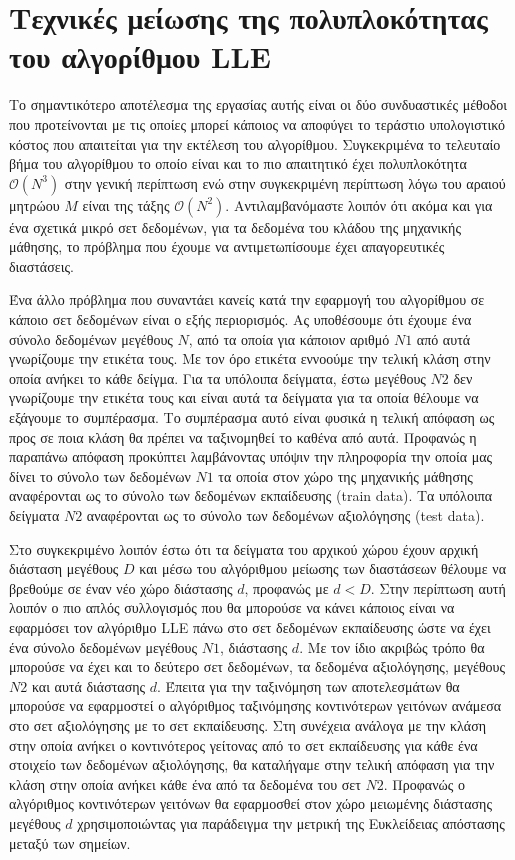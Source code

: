 
\chapter{Τεχνικές μείωσης της πολυπλοκότητας του αλγορίθμου \textlatin{LLE}}
\par
Το σημαντικότερο αποτέλεσμα της εργασίας αυτής είναι οι δύο συνδυαστικές μέθοδοι που προτείνονται με τις οποίες μπορεί κάποιος να αποφύγει το τεράστιο υπολογιστικό κόστος που απαιτείται για την εκτέλεση του αλγορίθμου. Συγκεκριμένα το τελευταίο βήμα του αλγορίθμου το οποίο είναι και το πιο απαιτητικό έχει πολυπλοκότητα $\mathcal{O}(N^{3})$ στην γενική περίπτωση ενώ στην συγκεκριμένη περίπτωση λόγω του αραιού μητρώου $M$ είναι της τάξης $\mathcal{O}(N^{2})$. Αντιλαμβανόμαστε λοιπόν ότι ακόμα και για ένα σχετικά μικρό σετ δεδομένων, για τα δεδομένα του κλάδου της μηχανικής μάθησης, το πρόβλημα που έχουμε να αντιμετωπίσουμε έχει απαγορευτικές διαστάσεις. 
\par
Ένα άλλο πρόβλημα που συναντάει κανείς κατά την εφαρμογή του αλγορίθμου σε κάποιο σετ δεδομένων είναι ο εξής περιορισμός. Ας υποθέσουμε ότι έχουμε ένα σύνολο δεδομένων μεγέθους $N$, από τα οποία για κάποιον αριθμό $N1$ από αυτά γνωρίζουμε την ετικέτα τους. Με τον όρο ετικέτα εννοούμε την τελική κλάση στην οποία ανήκει το κάθε δείγμα. Για τα υπόλοιπα δείγματα, έστω μεγέθους $N2$ δεν γνωρίζουμε την ετικέτα τους και είναι αυτά τα δείγματα για τα οποία θέλουμε να εξάγουμε το συμπέρασμα. Το συμπέρασμα αυτό είναι φυσικά η τελική απόφαση ως προς σε ποια κλάση θα πρέπει να ταξινομηθεί το καθένα από αυτά. Προφανώς η παραπάνω απόφαση προκύπτει λαμβάνοντας υπόψιν την πληροφορία την οποία μας δίνει το σύνολο των δεδομένων $N1$ τα οποία στον χώρο της μηχανικής μάθησης αναφέρονται ως το σύνολο των δεδομένων εκπαίδευσης \textlatin{(train data)}. Τα υπόλοιπα δείγματα $N2$ αναφέρονται ως το σύνολο των δεδομένων αξιολόγησης \textlatin{(test data)}.
\par
Στο συγκεκριμένο λοιπόν έστω ότι τα δείγματα του αρχικού χώρου έχουν αρχική διάσταση μεγέθους $D$ και μέσω του αλγόριθμου μείωσης των διαστάσεων θέλουμε να βρεθούμε σε έναν νέο χώρο διάστασης $d$, προφανώς με $d < D$. Στην περίπτωση αυτή λοιπόν ο πιο απλός συλλογισμός που θα μπορούσε να κάνει κάποιος είναι να εφαρμόσει τον αλγόριθμο \textlatin{LLE} πάνω στο σετ δεδομένων εκπαίδευσης ώστε να έχει ένα σύνολο δεδομένων μεγέθους $Ν1$, διάστασης $d$. Με τον ίδιο ακριβώς τρόπο θα μπορούσε να έχει και το δεύτερο σετ δεδομένων, τα δεδομένα αξιολόγησης, μεγέθους $N2$ και αυτά διάστασης $d$. Έπειτα για την ταξινόμηση των αποτελεσμάτων θα μπορούσε να εφαρμοστεί ο αλγόριθμος ταξινόμησης κοντινότερων γειτόνων ανάμεσα στο σετ αξιολόγησης με το σετ εκπαίδευσης. Στη συνέχεια ανάλογα με την κλάση στην οποία ανήκει ο κοντινότερος γείτονας από το σετ εκπαίδευσης για κάθε ένα στοιχείο των δεδομένων αξιολόγησης, θα καταλήγαμε στην τελική απόφαση για την κλάση στην οποία ανήκει κάθε ένα από τα δεδομένα του σετ $N2$. Προφανώς ο αλγόριθμος κοντινότερων γειτόνων θα εφαρμοσθεί στον χώρο μειωμένης διάστασης μεγέθους $d$ χρησιμοποιώντας για παράδειγμα την μετρική της Ευκλείδειας απόστασης μεταξύ των σημείων.
